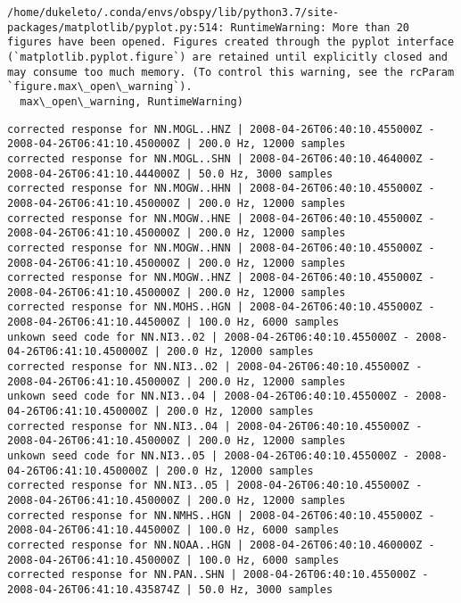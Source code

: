 \documentclass[11pt]{article}
\begin{document}
    \begin{Verbatim}[commandchars=\\\{\}]
/home/dukeleto/.conda/envs/obspy/lib/python3.7/site-packages/matplotlib/pyplot.py:514: RuntimeWarning: More than 20 figures have been opened. Figures created through the pyplot interface (`matplotlib.pyplot.figure`) are retained until explicitly closed and may consume too much memory. (To control this warning, see the rcParam `figure.max\_open\_warning`).
  max\_open\_warning, RuntimeWarning)

    \end{Verbatim}

    \begin{Verbatim}[commandchars=\\\{\}]
corrected response for NN.MOGL..HNZ | 2008-04-26T06:40:10.455000Z - 2008-04-26T06:41:10.450000Z | 200.0 Hz, 12000 samples
corrected response for NN.MOGL..SHN | 2008-04-26T06:40:10.464000Z - 2008-04-26T06:41:10.444000Z | 50.0 Hz, 3000 samples
corrected response for NN.MOGW..HHN | 2008-04-26T06:40:10.455000Z - 2008-04-26T06:41:10.450000Z | 200.0 Hz, 12000 samples
corrected response for NN.MOGW..HNE | 2008-04-26T06:40:10.455000Z - 2008-04-26T06:41:10.450000Z | 200.0 Hz, 12000 samples
corrected response for NN.MOGW..HNN | 2008-04-26T06:40:10.455000Z - 2008-04-26T06:41:10.450000Z | 200.0 Hz, 12000 samples
corrected response for NN.MOGW..HNZ | 2008-04-26T06:40:10.455000Z - 2008-04-26T06:41:10.450000Z | 200.0 Hz, 12000 samples
corrected response for NN.MOHS..HGN | 2008-04-26T06:40:10.455000Z - 2008-04-26T06:41:10.445000Z | 100.0 Hz, 6000 samples
unkown seed code for NN.NI3..02 | 2008-04-26T06:40:10.455000Z - 2008-04-26T06:41:10.450000Z | 200.0 Hz, 12000 samples
corrected response for NN.NI3..02 | 2008-04-26T06:40:10.455000Z - 2008-04-26T06:41:10.450000Z | 200.0 Hz, 12000 samples
unkown seed code for NN.NI3..04 | 2008-04-26T06:40:10.455000Z - 2008-04-26T06:41:10.450000Z | 200.0 Hz, 12000 samples
corrected response for NN.NI3..04 | 2008-04-26T06:40:10.455000Z - 2008-04-26T06:41:10.450000Z | 200.0 Hz, 12000 samples
unkown seed code for NN.NI3..05 | 2008-04-26T06:40:10.455000Z - 2008-04-26T06:41:10.450000Z | 200.0 Hz, 12000 samples
corrected response for NN.NI3..05 | 2008-04-26T06:40:10.455000Z - 2008-04-26T06:41:10.450000Z | 200.0 Hz, 12000 samples
corrected response for NN.NMHS..HGN | 2008-04-26T06:40:10.455000Z - 2008-04-26T06:41:10.445000Z | 100.0 Hz, 6000 samples
corrected response for NN.NOAA..HGN | 2008-04-26T06:40:10.460000Z - 2008-04-26T06:41:10.450000Z | 100.0 Hz, 6000 samples
corrected response for NN.PAN..SHN | 2008-04-26T06:40:10.455000Z - 2008-04-26T06:41:10.435874Z | 50.0 Hz, 3000 samples

\end{Verbatim}
\end{document}
